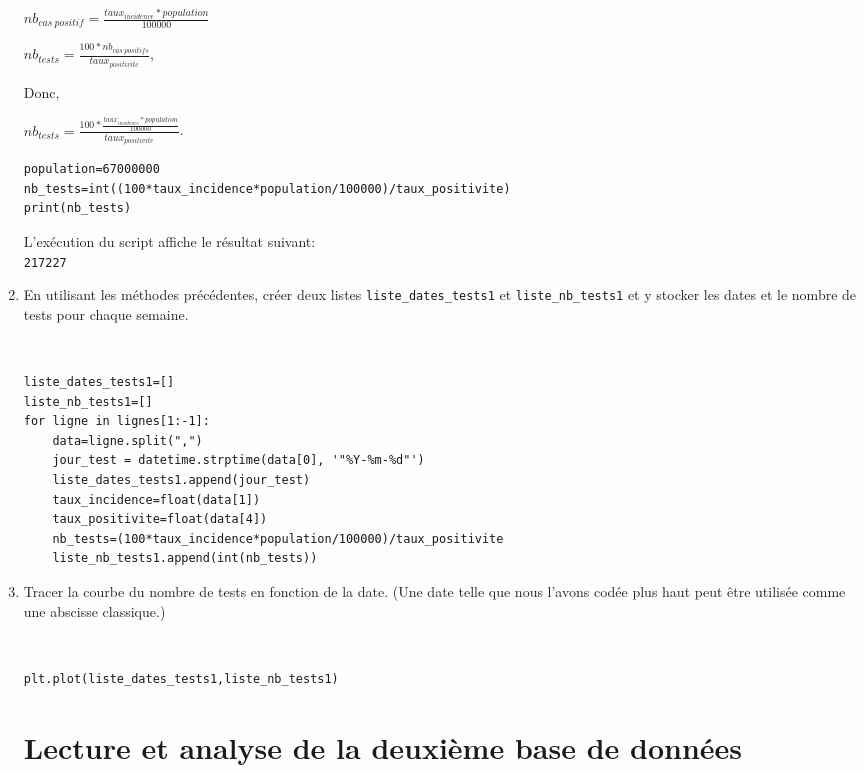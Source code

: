 \begin{enumerate}
\begin{solution}
$nb_{cas\ positif}=\frac{taux_{incidence}*population}{100000}$

$nb_{tests}=\frac{100*nb_{cas\ positifs}}{taux_{positivite}}$,

Donc,

$nb_{tests}=\frac{100*\frac{taux_{incidence}*population}{100000}}{taux_{positivite}}$.


\begin{verbatim}
population=67000000
nb_tests=int((100*taux_incidence*population/100000)/taux_positivite)
print(nb_tests)
 \end{verbatim}
\end{solution}

L'exécution du script affiche le résultat suivant:\\
\verb?217227?

\item En utilisant les méthodes précédentes, créer deux listes \verb?liste_dates_tests1? et \verb?liste_nb_tests1? et y stocker les dates et le nombre de tests pour chaque semaine.

\begin{solution}~\ \\
\begin{verbatim}
liste_dates_tests1=[]
liste_nb_tests1=[]
for ligne in lignes[1:-1]:
    data=ligne.split(",")
    jour_test = datetime.strptime(data[0], '"%Y-%m-%d"')
    liste_dates_tests1.append(jour_test)
    taux_incidence=float(data[1])
    taux_positivite=float(data[4])
    nb_tests=(100*taux_incidence*population/100000)/taux_positivite
    liste_nb_tests1.append(int(nb_tests))
\end{verbatim}
\end{solution}

\item Tracer la courbe du nombre de tests en fonction de la date. (Une date telle que nous l'avons codée plus haut peut être utilisée comme une abscisse classique.)

\begin{solution}~\ \\
\begin{verbatim}
plt.plot(liste_dates_tests1,liste_nb_tests1)
\end{verbatim}
\end{solution}

\section*{Lecture et analyse de la deuxième base de données}


\end{enumerate}
